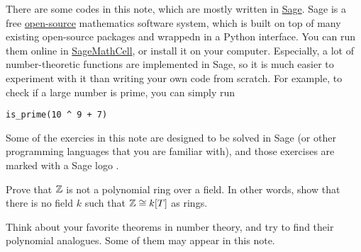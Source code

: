 There are some codes in this note, which are mostly written in \href{https://www.sagemath.org/}{Sage}.
Sage is a free \href{https://github.com/sagemath/sage}{open-source} mathematics software system, which is built on top of many existing open-source packages and wrappedn in a Python interface.
You can run them online in \href{https://sagecell.sagemath.org/}{SageMathCell}, or install it on your computer.
Especially, a lot of number-theoretic functions are implemented in Sage, so it is much easier to experiment with it than writing your own code from scratch.
For example, to check if a large number is prime, you can simply run
\begin{verbatim}
is_prime(10 ^ 9 + 7)
\end{verbatim}
Some of the exercies in this note are designed to be solved in Sage (or other programming languages that you are familiar with), and those exercises are marked with a Sage logo \sage.




\begin{exercise}
    Prove that $\mathbb{Z}$ is not a polynomial ring over a field. In other words, show that there is no field $k$ such that $\mathbb{Z} \cong k[T]$ as rings.
\end{exercise}

\begin{exercise}
    Think about your favorite theorems in number theory, and try to find their polynomial analogues. Some of them may appear in this note.
\end{exercise}


\newpage